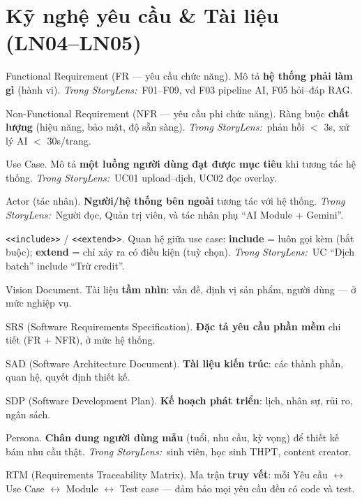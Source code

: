 \documentclass[11pt]{article}
\newcommand{\code}[1]{\texttt{\small #1}}
\newcommand{\insl}{\textit{\textcolor{steel}{Trong StoryLens:}}\ }
\begin{document}
\section{Kỹ nghệ yêu cầu \& Tài liệu (LN04--LN05)}
\begin{terms}
\item[Functional Requirement (FR --- yêu cầu chức năng).] Mô tả \textbf{hệ thống phải làm gì} (hành vi). \insl F01--F09, vd F03 pipeline AI, F05 hỏi--đáp RAG.
\item[Non-Functional Requirement (NFR --- yêu cầu phi chức năng).] Ràng buộc \textbf{chất lượng} (hiệu năng, bảo mật, độ sẵn sàng). \insl phản hồi $<$ 3s, xử lý AI $<$ 30s/trang.
\item[Use Case.] Mô tả \textbf{một luồng người dùng đạt được mục tiêu} khi tương tác hệ thống. \insl UC01 upload--dịch, UC02 đọc overlay.
\item[Actor (tác nhân).] \textbf{Người/hệ thống bên ngoài} tương tác với hệ thống. \insl Người đọc, Quản trị viên, và tác nhân phụ ``AI Module + Gemini''.
\item[\code{<<include>>} / \code{<<extend>>}.] Quan hệ giữa use case: \textbf{include} = luôn gọi kèm (bắt buộc); \textbf{extend} = chỉ xảy ra có điều kiện (tuỳ chọn). \insl UC ``Dịch batch'' include ``Trừ credit''.
\item[Vision Document.] Tài liệu \textbf{tầm nhìn}: vấn đề, định vị sản phẩm, người dùng --- ở mức nghiệp vụ.
\item[SRS (Software Requirements Specification).] \textbf{Đặc tả yêu cầu phần mềm} chi tiết (FR + NFR), ở mức hệ thống.
\item[SAD (Software Architecture Document).] \textbf{Tài liệu kiến trúc}: các thành phần, quan hệ, quyết định thiết kế.
\item[SDP (Software Development Plan).] \textbf{Kế hoạch phát triển}: lịch, nhân sự, rủi ro, ngân sách.
\item[Persona.] \textbf{Chân dung người dùng mẫu} (tuổi, nhu cầu, kỳ vọng) để thiết kế bám nhu cầu thật. \insl sinh viên, học sinh THPT, content creator.
\item[RTM (Requirements Traceability Matrix).] Ma trận \textbf{truy vết}: mỗi Yêu cầu $\leftrightarrow$ Use Case $\leftrightarrow$ Module $\leftrightarrow$ Test case --- đảm bảo mọi yêu cầu đều có code và test.
\end{terms}

\end{document}
